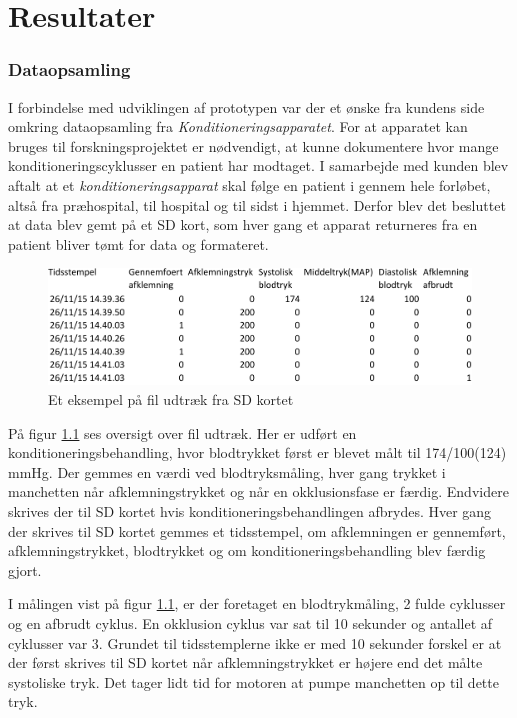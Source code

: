 \chapter{Resultater} \label{title:resultater}




\subsection{Dataopsamling}
I forbindelse med udviklingen af prototypen var der et ønske fra kundens side omkring dataopsamling fra \textit{Konditioneringsapparatet}. For at apparatet kan bruges til forskningsprojektet er nødvendigt, at kunne dokumentere hvor mange konditioneringscyklusser en patient har modtaget. I samarbejde med kunden blev aftalt at et \textit{konditioneringsapparat} skal følge en patient i gennem hele forløbet, altså fra præhospital, til hospital og til sidst i hjemmet. Derfor blev det besluttet at data blev gemt på et SD kort, som hver gang et apparat returneres fra en patient bliver tømt for data og formateret. 

\begin{figure}[H]
	\includegraphics[width = \textwidth]{billeder/fileksempel-crop.pdf}
	\caption{Et eksempel på fil udtræk fra SD kortet}\label{fig:fileksempel}
\end{figure}

På figur \ref{fig:fileksempel} ses oversigt over fil udtræk. Her er udført en konditioneringsbehandling, hvor blodtrykket først er blevet målt til 174/100(124) mmHg. Der gemmes en værdi ved blodtryksmåling, hver gang trykket i manchetten når afklemningstrykket og når en okklusionsfase er færdig. Endvidere skrives der til SD kortet hvis konditioneringsbehandlingen afbrydes. Hver gang der skrives til SD kortet gemmes et tidsstempel, om afklemningen er gennemført, afklemningstrykket, blodtrykket og om konditioneringsbehandling blev færdig gjort. 

I målingen vist på figur \ref{fig:fileksempel}, er der foretaget en blodtrykmåling, 2 fulde cyklusser og en afbrudt cyklus. En okklusion cyklus var sat til 10 sekunder og antallet af cyklusser var 3. Grundet til tidsstemplerne ikke er med 10 sekunder forskel er at der først skrives til SD kortet når afklemningstrykket er højere end det målte systoliske tryk. Det tager lidt tid for motoren at pumpe manchetten op til dette tryk. 

